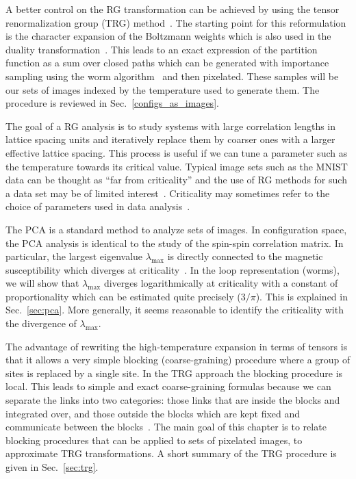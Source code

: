 \documentclass[../main.tex]{subfiles}
\begin{document}
A better control on the RG transformation can be achieved by using the tensor
renormalization group (TRG)
method~\cite{PhysRevLett.99.120601,PhysRevB.79.085118,PhysRevB.86.045139,prb87,prd88,prd89,pre89}.
%
The starting point for this reformulation is the character expansion of the
Boltzmann weights which is also used in the duality
transformation~\cite{RevModPhys.52.453}.
%
This leads to an exact expression of the partition function as a sum over
closed paths which can be generated with importance sampling using the worm
algorithm~\cite{prok87} and then pixelated.
%
These samples will be our sets of images indexed by the temperature used to
generate them.
%
The procedure is reviewed in Sec.~\ref{configs_as_images}. 

The goal of a RG analysis is to study systems with large correlation lengths in
lattice spacing units and iteratively replace them by coarser ones with a
larger effective lattice spacing.
%
This process is useful if we can tune a parameter such as the temperature
towards its critical value.
%
Typical image sets such as the MNIST data can be thought as ``far from
criticality'' and the use of RG methods for such a data set may be of limited
interest~\cite{foreman2017}.
%
Criticality may sometimes refer to the choice of parameters used in data
analysis~\cite{PhysRevD.83.105014}. 

The PCA is a standard method to analyze sets of images.
%
In configuration space, the PCA analysis is identical to the study of the
spin-spin correlation matrix.
%
In particular, the largest eigenvalue $\lambda_{\mathrm{max}}$ is directly
connected to the magnetic susceptibility which diverges at
criticality~\cite{PhysRevB.94.195105}.
%
In the loop representation (worms), we will show that $\lambda_{\mathrm{max}}$
diverges logarithmically at criticality  with a constant of proportionality
which can be estimated quite precisely ($3/\pi$).
%
This is explained in Sec.~\ref{sec:pca}.
%
More generally, it seems reasonable to identify the criticality with the
divergence of $\lambda_{\mathrm{max}}$.

The advantage of rewriting the high-temperature expansion in terms of tensors
is that it allows a very simple blocking (coarse-graining) procedure where a
group of sites is replaced by a single site.
%
In the TRG approach the blocking procedure is local.
%
This leads to simple and exact coarse-graining formulas because we can separate
the links into two categories: those links that are inside the blocks and
integrated over, and those outside the blocks which are kept fixed and
communicate between the blocks~\cite{prb87}.
%
The main goal of this chapter is to relate blocking procedures that can be
applied to sets of pixelated images, to approximate TRG transformations.
%
A short summary of the TRG procedure is given in Sec.~\ref{sec:trg}.
\end{document}
